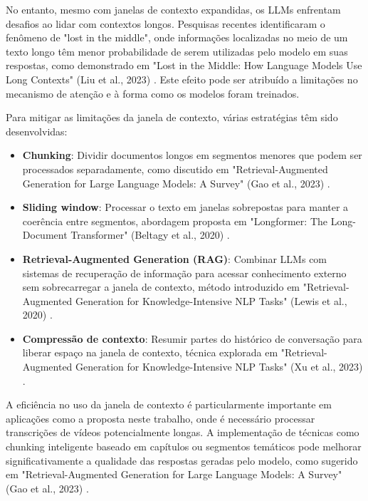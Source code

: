 \documentclass[tcc,capa]{texufpel}
\begin{document}
No entanto, mesmo com janelas de contexto expandidas, os LLMs enfrentam desafios ao lidar com contextos longos. Pesquisas recentes identificaram o fenômeno de "lost in the middle", onde informações localizadas no meio de um texto longo têm menor probabilidade de serem utilizadas pelo modelo em suas respostas, como demonstrado em "Lost in the Middle: How Language Models Use Long Contexts" (Liu et al., 2023) \cite{liu2023lost}. Este efeito pode ser atribuído a limitações no mecanismo de atenção e à forma como os modelos foram treinados.

Para mitigar as limitações da janela de contexto, várias estratégias têm sido desenvolvidas:

\begin{itemize}
    \item \textbf{Chunking}: Dividir documentos longos em segmentos menores que podem ser processados separadamente, como discutido em "Retrieval-Augmented Generation for Large Language Models: A Survey" (Gao et al., 2023) \cite{gao2023retrieval}.
    
    \item \textbf{Sliding window}: Processar o texto em janelas sobrepostas para manter a coerência entre segmentos, abordagem proposta em "Longformer: The Long-Document Transformer" (Beltagy et al., 2020) \cite{beltagy2020longformer}.
    
    \item \textbf{Retrieval-Augmented Generation (RAG)}: Combinar LLMs com sistemas de recuperação de informação para acessar conhecimento externo sem sobrecarregar a janela de contexto, método introduzido em "Retrieval-Augmented Generation for Knowledge-Intensive NLP Tasks" (Lewis et al., 2020) \cite{lewis2020retrieval}.
    
    \item \textbf{Compressão de contexto}: Resumir partes do histórico de conversação para liberar espaço na janela de contexto, técnica explorada em "Retrieval-Augmented Generation for Knowledge-Intensive NLP Tasks" (Xu et al., 2023) \cite{xu2023retrieval}.
\end{itemize}

A eficiência no uso da janela de contexto é particularmente importante em aplicações como a proposta neste trabalho, onde é necessário processar transcrições de vídeos potencialmente longas. A implementação de técnicas como chunking inteligente baseado em capítulos ou segmentos temáticos pode melhorar significativamente a qualidade das respostas geradas pelo modelo, como sugerido em "Retrieval-Augmented Generation for Large Language Models: A Survey" (Gao et al., 2023) \cite{gao2023retrieval}.
\end{document}
